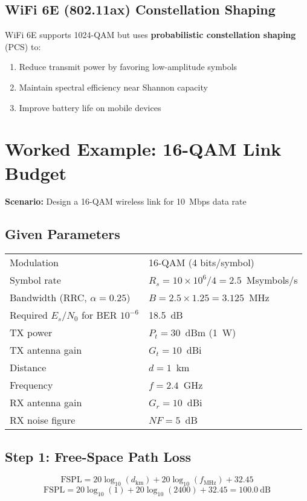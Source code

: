 \subsection{WiFi 6E (802.11ax) Constellation Shaping}

WiFi 6E supports 1024-QAM but uses \textbf{probabilistic constellation shaping} (PCS) to:
\begin{enumerate}
\item Reduce transmit power by favoring low-amplitude symbols
\item Maintain spectral efficiency near Shannon capacity
\item Improve battery life on mobile devices
\end{enumerate}

\section{Worked Example: 16-QAM Link Budget}

\textbf{Scenario:} Design a 16-QAM wireless link for 10~Mbps data rate

\subsection*{Given Parameters}

\begin{tabular}{@{}ll@{}}
Modulation & 16-QAM (4 bits/symbol) \\
Symbol rate & $R_s = 10 \times 10^6 / 4 = 2.5$~Msymbols/s \\
Bandwidth (RRC, $\alpha=0.25$) & $B = 2.5 \times 1.25 = 3.125$~MHz \\
Required $E_s/N_0$ for BER $10^{-6}$ & 18.5~dB \\
TX power & $P_t = 30$~dBm (1~W) \\
TX antenna gain & $G_t = 10$~dBi \\
Distance & $d = 1$~km \\
Frequency & $f = 2.4$~GHz \\
RX antenna gain & $G_r = 10$~dBi \\
RX noise figure & $NF = 5$~dB \\
\end{tabular}

\subsection*{Step 1: Free-Space Path Loss}

\begin{equation}
\mathrm{FSPL} = 20\log_{10}(d_{\text{km}}) + 20\log_{10}(f_{\text{MHz}}) + 32.45
\end{equation}
\begin{equation}
\mathrm{FSPL} = 20\log_{10}(1) + 20\log_{10}(2400) + 32.45 = 100.0~\text{dB}
\end{equation}

